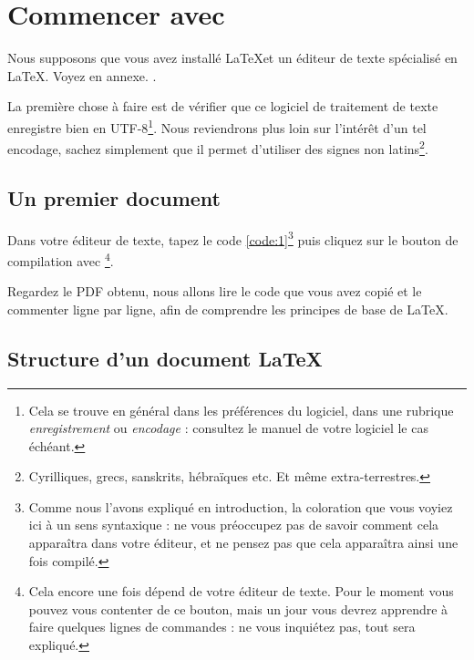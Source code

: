 \chapter{Commencer avec \XeLaTeX}\label{commencer}

\begin{prealable}
Nous supposons que vous avez installé \LaTeX et un éditeur de texte spécialisé en \LaTeX. Voyez en annexe. .

La première chose à faire est de vérifier que ce logiciel de traitement de texte enregistre bien en UTF-8\footnote{Cela se trouve en général dans les préférences du logiciel, dans une rubrique \emph{enregistrement} ou \emph{encodage} : consultez le manuel de votre logiciel le cas échéant.}. Nous reviendrons plus loin sur l'intérêt d'un tel encodage, sachez simplement que il permet d'utiliser des signes non latins\footnote{Cyrilliques, grecs, sanskrits, hébraïques etc. Et même extra-terrestres.}.

\end{prealable}

\section{Un premier document}

Dans votre éditeur de texte, tapez le code \ref{code:1}\footnote{Comme nous l'avons expliqué en introduction, la coloration que vous voyiez ici à un sens syntaxique : ne vous préoccupez pas de savoir comment cela apparaîtra dans votre éditeur, et ne pensez pas que cela apparaîtra ainsi une fois compilé.} puis cliquez sur le bouton de compilation avec \XeLaTeX \footnote{Cela encore une fois dépend de votre éditeur de texte. Pour le moment vous pouvez vous contenter de ce bouton, mais un jour vous devrez apprendre à faire quelques lignes de commandes : ne vous inquiétez pas, tout sera expliqué.}.


Regardez le PDF obtenu, nous allons lire le code que vous avez copié et le commenter ligne par ligne, afin de comprendre les principes de base de \LaTeX.
\FloatBarrier

\section{Structure d'un document \LaTeX}

